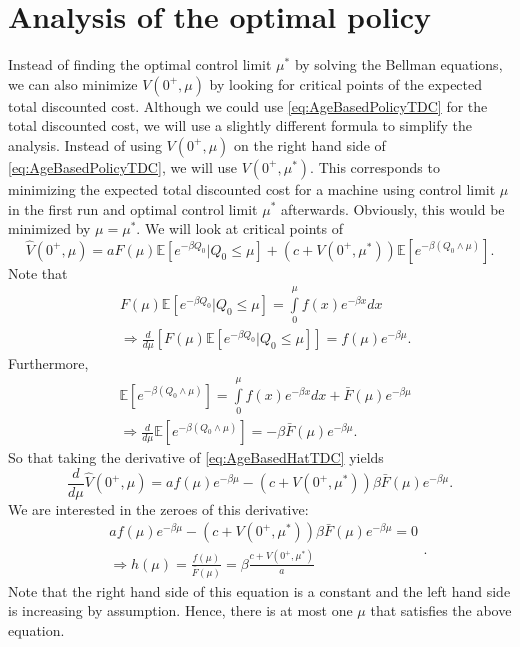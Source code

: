\section{Analysis of the optimal policy}\label{section:AgeBasedOptimalPolicy}
Instead of finding the optimal control limit $\mu^*$ by solving the Bellman equations, we can also minimize $V(0^+,\mu)$ by looking for critical points of the expected total discounted cost.
Although we could use \eqref{eq:AgeBasedPolicyTDC} for the total discounted cost, we will use a slightly different formula to simplify the analysis.
Instead of using $V(0^+,\mu)$ on the right hand side of \eqref{eq:AgeBasedPolicyTDC}, we will use $V(0^+,\mu^*)$.
This corresponds to minimizing the expected total discounted cost for a machine using control limit $\mu$ in the first run and optimal control limit $\mu^*$ afterwards.
Obviously, this would be minimized by $\mu=\mu^*$.
We will look at critical points of
\begin{equation}\label{eq:AgeBasedHatTDC}
\hat{V}(0^+,\mu)=aF(\mu)\mathbb{E}[e^{-\beta Q_0}|Q_0\leq \mu]+(c+V(0^+,\mu^*))\mathbb{E}[e^{-\beta(Q_0\wedge\mu)}].
\end{equation}
Note that 
\[
\begin{split}
&F(\mu)\mathbb{E}[e^{-\beta Q_0}|Q_0\leq \mu]=\int\limits_0^\mu f(x)e^{-\beta x}dx\\
&\Rightarrow \frac{d}{d\mu}\left[F(\mu)\mathbb{E}[e^{-\beta Q_0}|Q_0\leq \mu]\right]=f(\mu)e^{-\beta \mu}.
\end{split}
\]
Furthermore,
\[
\begin{split}
&\mathbb{E}[e^{-\beta(Q_0\wedge\mu)}]=\int\limits_0^\mu f(x)e^{-\beta x}dx+\bar{F}(\mu)e^{-\beta\mu}\\
&\Rightarrow \frac{d}{d\mu}\mathbb{E}[e^{-\beta(Q_0\wedge\mu)}]=-\beta\bar{F}(\mu)e^{-\beta\mu}.
\end{split}
\]
So that taking the derivative of \eqref{eq:AgeBasedHatTDC} yields
\[\frac{d}{d\mu}\hat{V}(0^+,\mu)=af(\mu)e^{-\beta\mu}-(c+V(0^+,\mu^*))\beta\bar{F}(\mu)e^{-\beta\mu}.\]
We are interested in the zeroes of this derivative:
\[
\begin{split}
&af(\mu)e^{-\beta\mu}-(c+V(0^+,\mu^*))\beta\bar{F}(\mu)e^{-\beta\mu}=0\\
&\Rightarrow h(\mu)=\frac{f(\mu)}{\bar{F}(\mu)}=\beta\frac{c+V(0^+,\mu^*)}{a}
\end{split}
.\]
Note that the right hand side of this equation is a constant and the left hand side is increasing by assumption.
Hence, there is at most one $\mu$ that satisfies the above equation.
